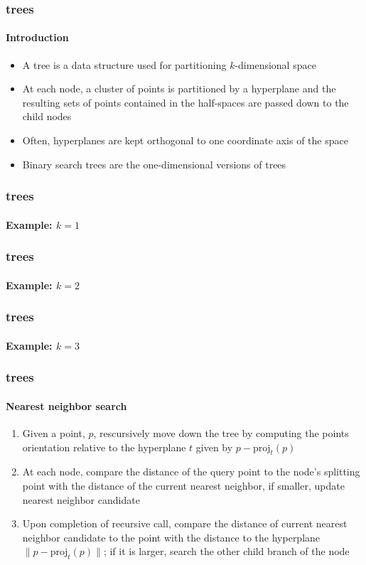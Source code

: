

\begin{frame}
  \frametitle{\kd trees}
  \framesubtitle{Introduction}

  \begin{itemize}
    \item A \kd tree is a data structure used for partitioning $k$-dimensional space
    \item At each node, a cluster of points is partitioned by a hyperplane and the resulting
      sets of points contained in the half-spaces are passed down to the child nodes
    \item Often, hyperplanes are kept orthogonal to one coordinate axis of the space
    \item Binary search trees are the one-dimensional versions of \kd trees
  \end{itemize}
\end{frame}

\begin{frame}
  \frametitle{\kd trees}
  \framesubtitle{Example: $k=1$}

  \begin{figure}
    \centering
  \end{figure}
  
\end{frame}

\begin{frame}
  \frametitle{\kd trees}
  \framesubtitle{Example: $k=2$}
  
\end{frame}

\begin{frame}
  \frametitle{\kd trees}
  \framesubtitle{Example: $k=3$}
  
\end{frame}

\begin{frame}
  \frametitle{\kd trees}
  \framesubtitle{Nearest neighbor search}

  \begin{enumerate}
    \item Given a point, $p$, rescursively move down the tree by computing the points orientation relative to the 
      hyperplane $t$ given by $p - \text{proj}_t(p)$
    \item At each node, compare the distance of the query point to the node's splitting point with the distance
      of the current nearest neighbor, if smaller, update nearest neighbor candidate
    \item Upon completion of recursive call, compare the distance of current nearest neighbor 
      candidate to the point with the distance to the hyperplane $\|p - \text{proj}_t(p)\|$; 
      if it is larger, search the other child branch of the node
  \end{enumerate}

\end{frame}

